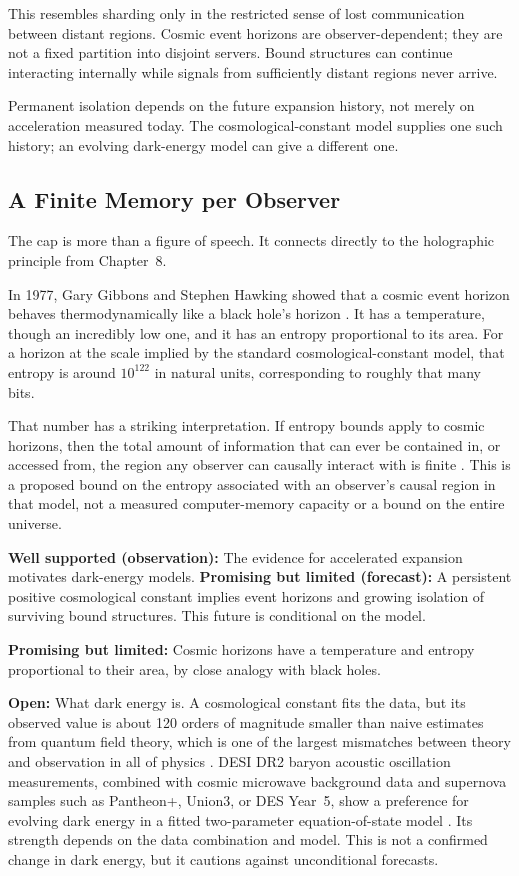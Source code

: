 This resembles sharding only in the restricted sense of lost communication between distant regions. Cosmic event horizons are observer-dependent; they are not a fixed partition into disjoint servers. Bound structures can continue interacting internally while signals from sufficiently distant regions never arrive.

Permanent isolation depends on the future expansion history, not merely on acceleration measured today. The cosmological-constant model supplies one such history; an evolving dark-energy model can give a different one.

\subsection{A Finite Memory per Observer}

The cap is more than a figure of speech. It connects directly to the holographic principle from Chapter~8.

In 1977, Gary Gibbons and Stephen Hawking showed that a cosmic event horizon behaves thermodynamically like a black hole's horizon \cite{gibbonshawking1977}. It has a temperature, though an incredibly low one, and it has an entropy proportional to its area. For a horizon at the scale implied by the standard cosmological-constant model, that entropy is around \(10^{122}\) in natural units, corresponding to roughly that many bits.

That number has a striking interpretation. If entropy bounds apply to cosmic horizons, then the total amount of information that can ever be contained in, or accessed from, the region any observer can causally interact with is finite \cite{bousso2002}. This is a proposed bound on the entropy associated with an observer's causal region in that model, not a measured computer-memory capacity or a bound on the entire universe.

\begin{researchnotebox}
\textbf{Well supported (observation):} The evidence for accelerated expansion motivates dark-energy models. \textbf{Promising but limited (forecast):} A persistent positive cosmological constant implies event horizons and growing isolation of surviving bound structures. This future is conditional on the model.

\textbf{Promising but limited:} Cosmic horizons have a temperature and entropy proportional to their area, by close analogy with black holes.

\textbf{Open:} What dark energy is. A cosmological constant fits the data, but its observed value is about 120 orders of magnitude smaller than naive estimates from quantum field theory, which is one of the largest mismatches between theory and observation in all of physics \cite{weinberg1989}. DESI DR2 baryon acoustic oscillation measurements, combined with cosmic microwave background data and supernova samples such as Pantheon+, Union3, or DES Year~5, show a preference for evolving dark energy in a fitted two-parameter equation-of-state model \cite{desi2025dr2}. Its strength depends on the data combination and model. This is not a confirmed change in dark energy, but it cautions against unconditional forecasts.
\end{researchnotebox}

